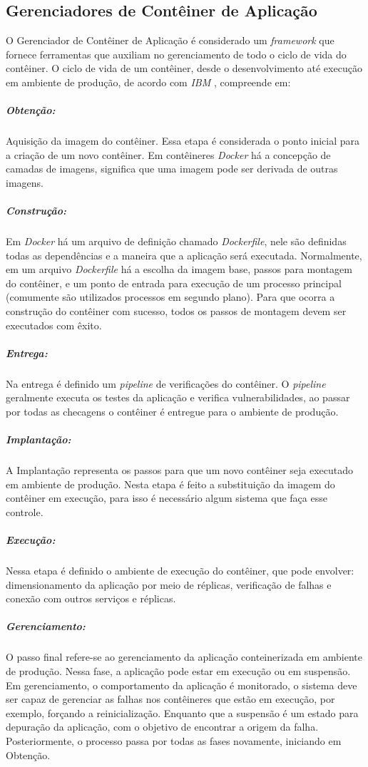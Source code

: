 
\subsection{Gerenciadores de Contêiner de Aplicação}
O Gerenciador de Contêiner de Aplicação é considerado um \textit{framework} que fornece ferramentas que auxiliam no gerenciamento de todo o ciclo de vida do contêiner. O ciclo de vida de um contêiner, desde o desenvolvimento até execução em ambiente de produção, de acordo com \textit{IBM} \cite{ibm-ciclo}, compreende em:

\subparagraph{Obtenção:}
Aquisição da imagem do contêiner. Essa etapa é considerada o ponto inicial para a criação de um novo contêiner. Em contêineres \textit{Docker} há a concepção de camadas de imagens, significa que uma imagem pode ser derivada de outras imagens.
\subparagraph{Construção:}
Em \textit{Docker} há um arquivo de definição chamado \textit{Dockerfile}, nele são definidas todas as dependências e a maneira que a aplicação será executada. Normalmente, em um arquivo \textit{Dockerfile} há a escolha da imagem base, passos para montagem do contêiner, e um ponto de entrada para execução de um processo principal (comumente são utilizados processos em segundo plano). Para que ocorra a construção do contêiner com sucesso, todos os passos de montagem devem ser executados com êxito.
\subparagraph{Entrega:}
Na entrega é definido um \textit{pipeline} de verificações do contêiner. O \textit{pipeline} geralmente executa os testes da aplicação e verifica vulnerabilidades, ao passar por todas as checagens o contêiner é entregue para o ambiente de produção.
\subparagraph{Implantação:}
A Implantação representa os passos para que um novo contêiner seja executado em ambiente de produção. Nesta etapa é feito a substituição da imagem do contêiner em execução, para isso é necessário algum sistema que faça esse controle.
 
\subparagraph{Execução:}
Nessa etapa é definido o ambiente de execução do contêiner, que pode envolver: dimensionamento da aplicação por meio de réplicas, verificação de falhas e conexão com outros serviços e réplicas.

\subparagraph{Gerenciamento:}
O passo final refere-se ao gerenciamento da aplicação conteinerizada em ambiente de produção. Nessa fase, a aplicação pode estar em execução ou em suspensão. Em gerenciamento, o comportamento da aplicação é monitorado, o sistema deve ser capaz de gerenciar as falhas nos contêineres que estão em execução, por exemplo, forçando a reinicialização. Enquanto que a suspensão é um estado para depuração da aplicação, com o objetivo de encontrar a origem da falha. Posteriormente, o processo passa por todas as fases novamente, iniciando em Obtenção.

